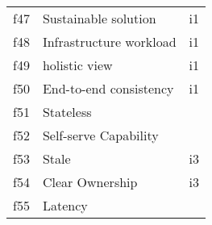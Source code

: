 \begin{tabular}{|c|p{}|p{}|}
f47 & Sustainable solution & \cellcolor{emerald_shape_1} {i1}\\
f48 & Infrastructure workload & \cellcolor{emerald_shape_1} {i1}\\
f49 & holistic view & \cellcolor{emerald_shape_1} {i1}\\
f50 & End-to-end consistency & \cellcolor{emerald_shape_1} {i1}\\
f51 & Stateless & \cellcolor{emerald_shape_1} {}\\
f52 & Self-serve Capability & \cellcolor{emerald_shape_1} {}\\
f53 & Stale & \cellcolor{emerald_shape_1} {i3}\\
f54 & Clear Ownership & \cellcolor{emerald_shape_1} {i3}\\
f55 & Latency & \cellcolor{emerald_shape_1} {}\\
\hline
\end{tabular}
